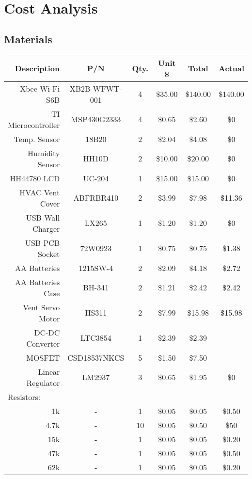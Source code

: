 \section{Cost Analysis}
\subsection{Materials}
\begin{center}
\begin{tabular}{|r|c|c|c|c|c|}
\hline
{Description} & {P/N} & {Qty.} & {Unit \$} & {Total} & {Actual}\\
\hline
\hline
Xbee Wi-Fi S6B & XB2B-WFWT-001 & 4 & \$35.00 & \$140.00 & \$140.00\\
\hline
TI Microcontroller & MSP430G2333 & 4 & \$0.65 & \$2.60 & \$0\\
\hline
Temp. Sensor & 18B20 & 2 & \$2.04 & \$4.08 & \$0\\
\hline
Humidity Sensor & HH10D & 2 & \$10.00 & \$20.00 & \$0\\
\hline
HH44780 LCD & UC-204 & 1 & \$15.00 & \$15.00 & \$0\\
\hline
HVAC Vent Cover & ABFRBR410 & 2 & \$3.99 & \$7.98 & \$11.36\\
\hline
USB Wall Charger & LX265 & 1 & \$1.20 & \$1.20 & \$0\\
\hline
USB PCB Socket & 72W0923 & 1 & \$0.75 & \$0.75 & \$1.38\\
\hline
AA Batteries & 1215SW-4 & 2 & \$2.09 & \$4.18 & \$2.72\\
\hline
AA Batteries Case & BH-341 & 2 & \$1.21 & \$2.42 & \$2.42\\
\hline
Vent Servo Motor & HS311 & 2 & \$7.99 & \$15.98 & \$15.98\\
\hline
DC-DC Converter & LTC3854 & 1 & \$2.39 & \$2.39 &\\
\hline
MOSFET & CSD18537NKCS & 5 & \$1.50 & \$7.50 &\\
\hline
Linear Regulator & LM2937 & 3 & \$0.65 & \$1.95 & \$0\\
\hline
\multicolumn{1}{|l|}{Resistors:} &   &   &   &  &\\
\hline
1k & - & 1 & \$0.05 & \$0.05 & \$0.50\\
\hline
{4.7k} & - & 10 & \$0.05 & \$0.50 & \$50\\
\hline
{15k} & - & 1 & \$0.05 & \$0.05 & \$0.20\\
\hline
{47k} & - & 1 & \$0.05 & \$0.05 & \$0.50\\
\hline
{62k} & - & 1 & \$0.05 & \$0.05 & \$0.20\\

\end{tabular}
\end{center}

